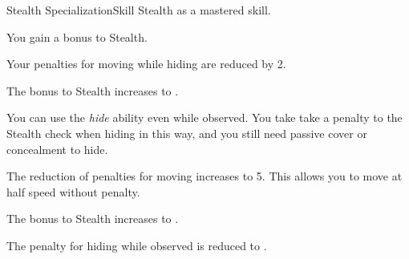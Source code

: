     \begin{feat}{Stealth Specialization}{Skill}
        \featpre Stealth as a mastered skill.
        \featben

         You gain a  bonus to Stealth.

        \ff[2]{}

         Your penalties for moving while hiding are reduced by 2. 

         The bonus to Stealth increases to .

         You can use the \textit{hide} ability even while observed.
        You take take a  penalty to the Stealth check when hiding in this way, and you still need passive cover or concealment to hide.

         The reduction of penalties for moving increases to 5.
        This allows you to move at half speed without penalty.

         The bonus to Stealth increases to .

         The penalty for hiding while observed is reduced to .
    \end{feat}

